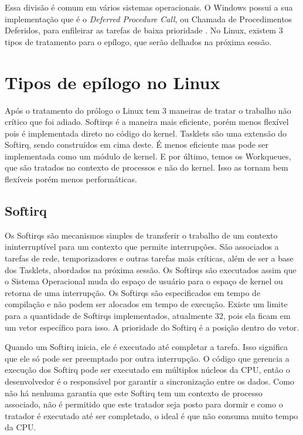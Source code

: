 Essa divisão é comum em vários sistemas operacionais. O Windows possui a sua implementação que é o \textit{Deferred Procedure Call}, ou Chamada de Procedimentos Deferidos, para enfileirar as tarefas de baixa prioridade \cite{InsideMicrosoftWindows}. No Linux, existem 3 tipos de tratamento para o epílogo, que serão delhados na próxima sessão.

\section{Tipos de epílogo no Linux}

Após o tratamento do prólogo o Linux tem 3 maneiras de tratar o trabalho não crítico que foi adiado. Softirqs é a maneira mais eficiente, porém menos flexível pois é implementada direto no código do kernel. Tasklets são uma extensão do Softirq, sendo construídos em cima deste. É menos eficiente mas pode ser implementada como um módulo de kernel. E por último, temos os Workqueues, que são tratados no contexto de processos e não do kernel. Isso as tornam bem flexíveis porém menos performáticas. \cite{OReilly}

\subsection{Softirq}

Os Softirqs são mecanismos simples de transferir o trabalho de um contexto ininterruptível para um contexto que permite interrupções. São associados a tarefas de rede, temporizadores e outras tarefas mais críticas, além de ser a base dos Tasklets, abordados na próxima sessão. Os Softirqs são executados assim que o Sistema Operacional muda do espaço de usuário para o espaço de kernel ou retorna de uma interrupção. Os Softirqs são especificados em tempo de compilação e não podem ser alocados em tempo de execução. Existe um limite para a quantidade de Softirqs implementados, atualmente 32, pois ela ficam em um vetor específico para isso. A prioridade do Softirq é a posição dentro do vetor.

Quando um Softirq inicia, ele é executado até completar a tarefa. Isso significa que ele só pode ser preemptado por outra interrupção. O código que gerencia a execução dos Softirq pode ser executado em múltiplos núcleos da CPU, então o desenvolvedor é o responsável por garantir a sincronização entre os dados. Como não há nenhuma garantia que este Softirq tem um contexto de processo associado, não é permitido que este tratador seja posto para dormir e como o tratador é executado até ser completado, o ideal é que não consuma muito tempo da CPU.

